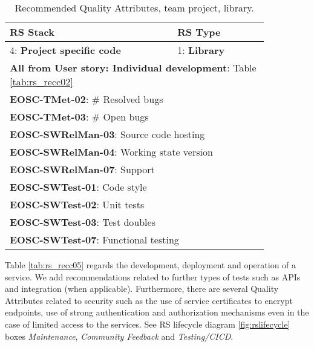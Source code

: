 \begin{table}[h]
  \centering
  \scriptsize
  \begin{tabular}{|p{0.55\linewidth}|p{0.3\linewidth}|} \hline

    \textbf{RS Stack} & \textbf{RS Type} \\ \hline \hline
    4: \textbf{Project specific code} & 1: \textbf{Library} \\ \hline
    \multicolumn{2}{|l|}{\textbf{All from User story: Individual development}: Table \ref{tab:rs_recc02}} \\ \hline
    \multicolumn{2}{|l|}{\textbf{EOSC-TMet-02}: \# Resolved bugs} \\ \hline
    \multicolumn{2}{|l|}{\textbf{EOSC-TMet-03}: \# Open bugs} \\ \hline
    \multicolumn{2}{|l|}{\textbf{EOSC-SWRelMan-03}: Source code hosting} \\ \hline
    \multicolumn{2}{|l|}{\textbf{EOSC-SWRelMan-04}: Working state version} \\ \hline
    \multicolumn{2}{|l|}{\textbf{EOSC-SWRelMan-07}: Support} \\ \hline
    \multicolumn{2}{|l|}{\textbf{EOSC-SWTest-01}: Code style} \\ \hline
    \multicolumn{2}{|l|}{\textbf{EOSC-SWTest-02}: Unit tests} \\ \hline
    \multicolumn{2}{|l|}{\textbf{EOSC-SWTest-03}: Test doubles} \\ \hline
    \multicolumn{2}{|l|}{\textbf{EOSC-SWTest-07}: Functional testing} \\ \hline

  \end{tabular}
  \caption{Recommended Quality Attributes, team project, library.}
  \label{tab:rs_recc04}
\end{table}

Table \ref{tab:rs_recc05} regards the development, deployment and operation of a service. We add recommendations related to further types of tests such as APIs and integration (when applicable). Furthermore, there are several Quality Attributes related to security such as the use of service certificates to encrypt endpoints, use of strong authentication and authorization mechanisms even in the case of limited access to the services. See RS lifecycle diagram \ref{fig:rslifecycle} boxes \textit{Maintenance}, \textit{Community Feedback} and \textit{Testing/CICD}.

